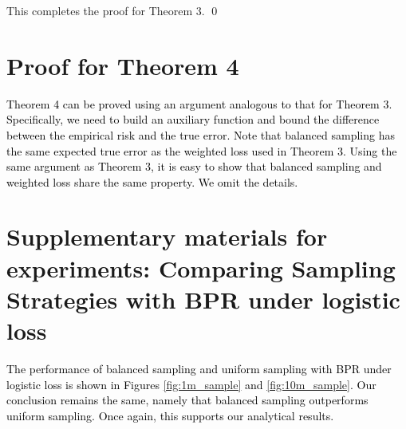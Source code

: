 \documentclass{article}
\numberwithin{equation}{section}
\newcommand{\laks}[1]{\textcolor{black}{#1}}
\newtheorem{sampling strategy}{Sampling Strategy}
\begin{document}
This completes the proof for Theorem 3. \qed 




\section{Proof for Theorem 4}

\laks{Theorem 4 can be proved using an argument analogous to that for Theorem 3. Specifically, 
 we need to build an auxiliary function and bound the difference between the empirical risk and the true error. Note that balanced sampling has the same expected true error as the weighted loss used in Theorem 3. Using the same argument as Theorem 3, it is easy to show that balanced sampling and weighted loss share the same property. We omit the details.} 


\section{Supplementary materials for experiments: Comparing Sampling Strategies with BPR under logistic loss}

\laks{The performance of balanced sampling and uniform sampling with BPR under logistic loss is shown in Figures \ref{fig:1m_sample} and \ref{fig:10m_sample}. Our conclusion remains the same, namely that balanced sampling outperforms uniform sampling. Once again, this supports our analytical results.}  








\end{document}
